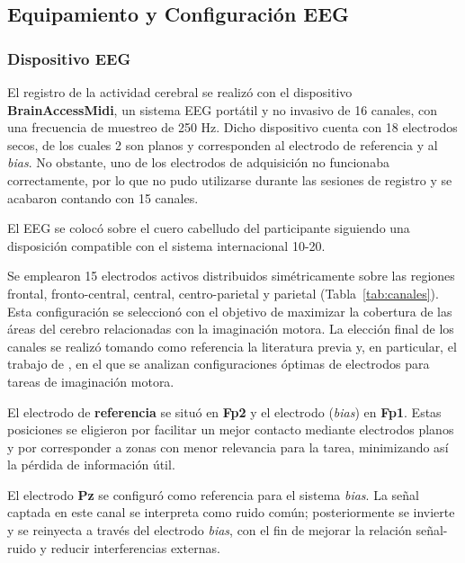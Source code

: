 \subsection{Equipamiento y Configuración EEG}
\label{subsec:equipamiento}

\subsubsection{Dispositivo EEG}

El registro de la actividad cerebral se realizó con el dispositivo \textbf{BrainAccessMidi}, un sistema EEG portátil y no invasivo de 16 canales, con una frecuencia de muestreo de 250 Hz. Dicho dispositivo cuenta con 18 electrodos secos, de los cuales 2 son planos y corresponden al electrodo de referencia y al \textit{bias}. No obstante, uno de los electrodos de adquisición no funcionaba correctamente, por lo que no pudo utilizarse durante las sesiones de registro y se acabaron contando con 15 canales.

El EEG se colocó sobre el cuero cabelludo del participante siguiendo una disposición compatible con el sistema internacional 10-20.

Se emplearon 15 electrodos activos distribuidos simétricamente sobre las regiones frontal, fronto-central, central, centro-parietal y parietal (Tabla~\ref{tab:canales}). Esta configuración se seleccionó con el objetivo de maximizar la cobertura de las áreas del cerebro relacionadas con la imaginación motora. La elección final de los canales se realizó tomando como referencia la literatura previa y, en particular, el trabajo de  \cite{configElectrodosMI}, en el que se analizan configuraciones óptimas de electrodos para tareas de imaginación motora.

El electrodo de \textbf{referencia} se situó en \textbf{Fp2} y el electrodo (\textit{bias}) en \textbf{Fp1}. Estas posiciones se eligieron por facilitar un mejor contacto mediante electrodos planos y por corresponder a zonas con menor relevancia para la tarea, minimizando así la pérdida de información útil.

El electrodo \textbf{Pz} se configuró como referencia para el sistema \textit{bias}. La señal captada en este canal se interpreta como ruido común; posteriormente se invierte y se reinyecta a través del electrodo \textit{bias}, con el fin de mejorar la relación señal-ruido y reducir interferencias externas.



